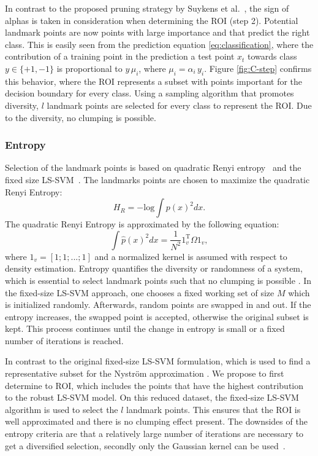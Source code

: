 \documentclass[preprint,12pt]{elsarticle}
\begin{document}
	In contrast to the proposed pruning strategy by Suykens et al.~\cite{suykens2000sparse}, the sign of alphas is taken in consideration when determining the ROI (step 2). Potential landmark points are now points with large importance and that predict the right class. This is easily seen from the prediction equation \eqref{eq:classification}, where the contribution of a training point in the prediction a test point $x_t$ towards class $y \in \{+1,-1\}$ is proportional to $y \, \mu_i$, where $\mu_i = \alpha_i \, y_i$. Figure \ref{fig:C-step} confirms this behavior, where the ROI represents a subset with points important for the decision boundary for every class. Using a sampling algorithm that promotes diversity, $l$ landmark points are selected for every class to represent the ROI. Due to the diversity, no clumping is possible.
	
	\subsubsection{Entropy}
	Selection of the landmark points is based on quadratic Renyi entropy~\cite{girolami2002orthogonal} and the fixed size LS-SVM~\cite{suykens2002least}. The landmarks points are chosen to maximize the quadratic Renyi Entropy:
	\begin{equation}
	\label{eq:Entropy1}
	H_R = -\mathrm{log}\int p(x)^2 dx.
	\end{equation}
	The quadratic Renyi Entropy is approximated by the following equation\cite{girolami2002orthogonal}:
	\begin{equation}
	\label{eq:Entropy2}
	\int \hat{p}(x)^2dx = \frac{1}{N^2} 1_v^\mathrm{T}\Omega 1_v,
	\end{equation}
	where $1_v = [1;1;...;1]$ and a normalized kernel is assumed with respect to density estimation. Entropy quantifies the diversity or randomness of a system, which is essential to select landmark points such that no clumping is possible . In the fixed-size LS-SVM approach, one chooses a fixed working set of size $M$ which is initialized randomly. Afterwards, random points are swapped in and out. If the entropy increases, the swapped point is accepted, otherwise the original subset is kept. This process continues until the change in entropy is small or a fixed number of iterations is reached. 
	
	In contrast to the original fixed-size LS-SVM formulation, which is used to find a representative subset for the Nystr\"{o}m approximation \cite{suykens2002least}. We propose to first determine to ROI, which includes the points that have the highest contribution to the robust LS-SVM model. On this reduced dataset, the fixed-size LS-SVM algorithm is used to select the $l$ landmark points. This ensures that the ROI is well approximated and there is no clumping effect present. The downsides of the entropy criteria are that a relatively large number of iterations are necessary to get a diversified selection, secondly only the Gaussian kernel can be used~\cite{girolami2002orthogonal}.
	
\end{document}
